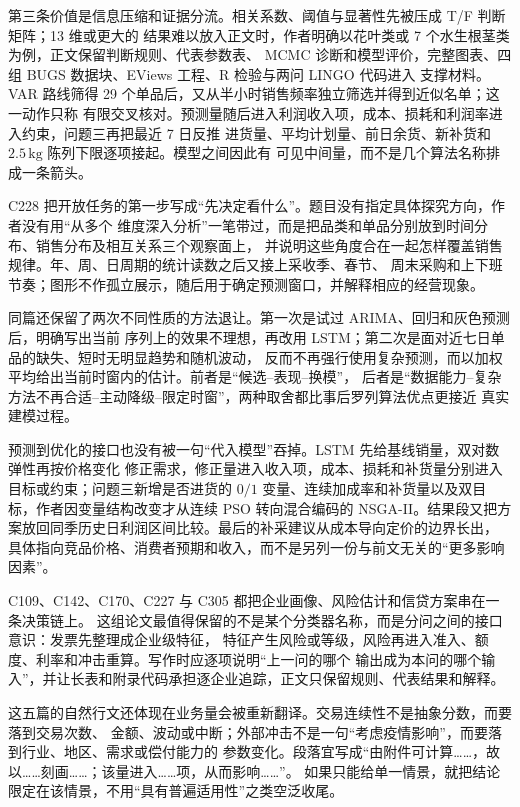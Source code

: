 第三条价值是信息压缩和证据分流。相关系数、阈值与显著性先被压成 T/F 判断矩阵；13 维或更大的
结果难以放入正文时，作者明确以花叶类或 7 个水生根茎类为例，正文保留判断规则、代表参数表、
MCMC 诊断和模型评价，完整图表、四组 BUGS 数据块、EViews 工程、R 检验与两问 LINGO 代码进入
支撑材料。VAR 路线筛得 29 个单品后，又从半小时销售频率独立筛选并得到近似名单；这一动作只称
有限交叉核对。预测量随后进入利润收入项，成本、损耗和利润率进入约束，问题三再把最近 7 日反推
进货量、平均计划量、前日余货、新补货和 $2.5\,\mathrm{kg}$ 陈列下限逐项接起。模型之间因此有
可见中间量，而不是几个算法名称排成一条箭头。

C228 把开放任务的第一步写成“先决定看什么”。题目没有指定具体探究方向，作者没有用“从多个
维度深入分析”一笔带过，而是把品类和单品分别放到时间分布、销售分布及相互关系三个观察面上，
并说明这些角度合在一起怎样覆盖销售规律。年、周、日周期的统计读数之后又接上采收季、春节、
周末采购和上下班节奏；图形不作孤立展示，随后用于确定预测窗口，并解释相应的经营现象。

同篇还保留了两次不同性质的方法退让。第一次是试过 ARIMA、回归和灰色预测后，明确写出当前
序列上的效果不理想，再改用 LSTM；第二次是面对近七日单品的缺失、短时无明显趋势和随机波动，
反而不再强行使用复杂预测，而以加权平均给出当前时窗内的估计。前者是“候选--表现--换模”，
后者是“数据能力--复杂方法不再合适--主动降级--限定时窗”，两种取舍都比事后罗列算法优点更接近
真实建模过程。

预测到优化的接口也没有被一句“代入模型”吞掉。LSTM 先给基线销量，双对数弹性再按价格变化
修正需求，修正量进入收入项，成本、损耗和补货量分别进入目标或约束；问题三新增是否进货的
$0/1$ 变量、连续加成率和补货量以及双目标，作者因变量结构改变才从连续 PSO 转向混合编码的
NSGA-II。结果段又把方案放回同季历史日利润区间比较。最后的补采建议从成本导向定价的边界长出，
具体指向竞品价格、消费者预期和收入，而不是另列一份与前文无关的“更多影响因素”。

C109、C142、C170、C227 与 C305 都把企业画像、风险估计和信贷方案串在一条决策链上。
这组论文最值得保留的不是某个分类器名称，而是分问之间的接口意识：发票先整理成企业级特征，
特征产生风险或等级，风险再进入准入、额度、利率和冲击重算。写作时应逐项说明“上一问的哪个
输出成为本问的哪个输入”，并让长表和附录代码承担逐企业追踪，正文只保留规则、代表结果和解释。

这五篇的自然行文还体现在业务量会被重新翻译。交易连续性不是抽象分数，而要落到交易次数、
金额、波动或中断；外部冲击不是一句“考虑疫情影响”，而要落到行业、地区、需求或偿付能力的
参数变化。段落宜写成“由附件可计算……，故以……刻画……；该量进入……项，从而影响……”。
如果只能给单一情景，就把结论限定在该情景，不用“具有普遍适用性”之类空泛收尾。

